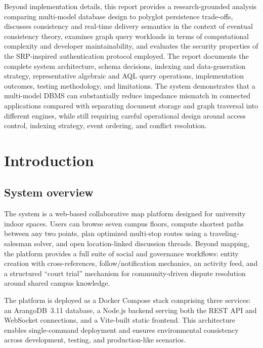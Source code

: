 \documentclass[13pt,a4paper]{report}
\begin{document}
Beyond implementation details, this report provides a research-grounded analysis comparing multi-model database design to polyglot persistence trade-offs, discusses consistency and real-time delivery semantics in the context of eventual consistency theory, examines graph query workloads in terms of computational complexity and developer maintainability, and evaluates the security properties of the SRP-inspired authentication protocol employed. The report documents the complete system architecture, schema decisions, indexing and data-generation strategy, representative algebraic and AQL query operations, implementation outcomes, testing methodology, and limitations. The system demonstrates that a multi-model DBMS can substantially reduce impedance mismatch in connected applications compared with separating document storage and graph traversal into different engines, while still requiring careful operational design around access control, indexing strategy, event ordering, and conflict resolution.

\chapter{Introduction}

\section{System overview}
The system is a web-based collaborative map platform designed for university indoor spaces. Users can browse seven campus floors, compute shortest paths between any two points, plan optimized multi-stop routes using a traveling-salesman solver, and open location-linked discussion threads. Beyond mapping, the platform provides a full suite of social and governance workflows: entity creation with cross-references, follow/notification mechanics, an activity feed, and a structured ``court trial'' mechanism for community-driven dispute resolution around shared campus knowledge.

The platform is deployed as a Docker Compose stack comprising three services: an ArangoDB~3.11 database, a Node.js backend serving both the REST API and WebSocket connections, and a Vite-built static frontend. This architecture enables single-command deployment and ensures environmental consistency across development, testing, and production-like scenarios.
\end{document}
